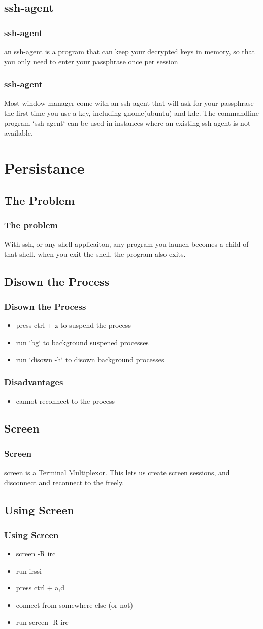 \documentclass[hyperref={pdfpagelabels=false}]{beamer}
\begin{document}
\subsection{ssh-agent}
\frame
{
    \frametitle{ssh-agent}
    an ssh-agent is a program that can keep your decrypted keys in memory, so that you only need to enter your passphrase once per session
}
\frame
{
    \frametitle{ssh-agent}
    Most window manager come with an ssh-agent that will ask for your passphrase the first time you use a key, including gnome(ubuntu) and kde.  The commandline program `ssh-agent` can be used in instances where an existing ssh-agent is not available.
}
\section{Persistance}
\subsection{The Problem}
\frame
{
    \frametitle{The problem}
    With ssh, or any shell applicaiton, any program you launch becomes a child of that shell.  when you exit the shell, the program also exits.

}
\subsection{Disown the Process}
\frame
{
  \frametitle{Disown the Process}
  \begin{itemize}
  \item{press ctrl + z to suspend the process}
  \item{run `bg` to background suspened processes}
  \item{run `disown -h` to disown background processes}
  \end{itemize}
}
\frame
{
    \frametitle{Disadvantages}
    \begin{itemize}
    \item{cannot reconnect to the process}
    \end{itemize}
}
\subsection{Screen}
\frame
{
  \frametitle{Screen}
  screen is a Terminal Multiplexor.
  This lets us create screen sessions, and disconnect and reconnect to the freely.
}
\subsection{Using Screen}
\frame
{
  \frametitle{Using Screen}
  \begin{itemize}
  \item{screen -R irc}
  \item{run irssi}
  \item{press ctrl + a,d}
  \item{connect from somewhere else (or not)}
  \item{run screen -R irc}
  \end{itemize}
}
\end{document}
